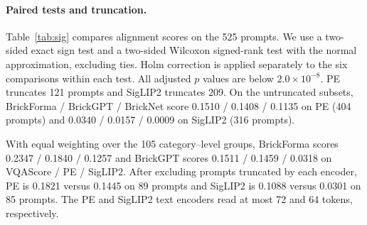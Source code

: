 \documentclass[letterpaper]{article} %
\begin{document}
\paragraph{Paired tests and truncation.}
Table~\ref{tab:sig} compares alignment scores on the 525 prompts. We use a two-sided exact sign test and a two-sided Wilcoxon signed-rank test with the normal approximation, excluding ties. Holm correction is applied separately to the six comparisons within each test. All adjusted $p$ values are below $2.0{\times}10^{-8}$. PE truncates 121 prompts and SigLIP2 truncates 209. On the untruncated subsets, BrickForma / BrickGPT / BrickNet score 0.1510 / 0.1408 / 0.1135 on PE (404 prompts) and 0.0340 / 0.0157 / 0.0009 on SigLIP2 (316 prompts).

%


With equal weighting over the 105 category--level groups, BrickForma scores 0.2347 / 0.1840 / 0.1257 and BrickGPT scores 0.1511 / 0.1459 / 0.0318 on VQAScore / PE / SigLIP2. After excluding prompts truncated by each encoder, PE is 0.1821 versus 0.1445 on 89 prompts and SigLIP2 is 0.1088 versus 0.0301 on 85 prompts. The PE and SigLIP2 text encoders read at most 72 and 64 tokens, respectively.
\end{document}
